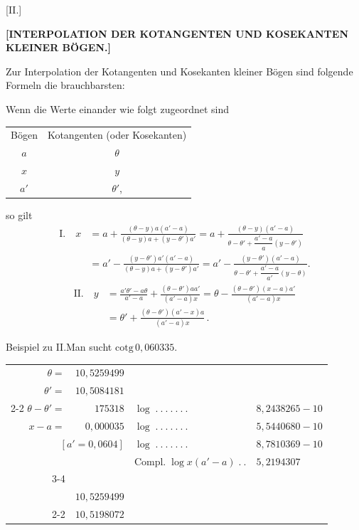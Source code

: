 \clearpage{}
\begin{center}
[II.]

\medskip
\textbf{[INTERPOLATION DER KOTANGENTEN UND KOSEKANTEN KLEINER BÖGEN.]}
\end{center}

Zur Interpolation der Kotangenten und Kosekanten kleiner Bögen sind
folgende Formeln die brauchbarsten:

Wenn die Werte einander wie folgt zugeordnet sind
\begin{center}
\begin{tabular}{cc}
Bögen & Kotangenten (oder Kosekanten) \\
$a$ & $\theta$ \\
$x$ & $y$ \\
$a'$ & $\theta'$, \\
\end{tabular}
\end{center}
so gilt
\[
\begin{aligned}
\mathrm{I.}\quad x &= a+\frac{(\theta-y)a(a'-a)}{(\theta-y)a+(y-\theta')a'}
=a+\frac{(\theta-y)(a'-a)}{\theta-\theta'+\dfrac{a'-a}{a}(y-\theta')}\\[5pt]
&=a'-\frac{(y-\theta')a'(a'-a)}{(\theta-y)a+(y-\theta')a'}
=a'-\frac{(y-\theta')(a'-a)}{\theta-\theta'+\dfrac{a'-a}{a'}(y-\theta)}.
\end{aligned}
\]
\[
\begin{aligned}
\mathrm{II.}\quad y&=\frac{a'\theta'-a\theta}{a'-a}+\frac{(\theta-\theta')aa'}{(a'-a)x}
=\theta-\frac{(\theta-\theta')(x-a)a'}{(a'-a)x}\\[5pt]
&=\theta'+\frac{(\theta-\theta')(a'-x)a}{(a'-a)x}\,.
\end{aligned}
\]

Beispiel zu II.\quad Man sucht $\mathrm{cotg}\,0{,}060335$.
\begin{center}\small
\begin{tabular}{r@{\;}r@{\quad}l@{\;}l}
$\theta=$ & $10{,}5259499$ &&\\
$\theta'=$ & $10{,}5084181$ &&\\\cline{2-2}
$\theta-\theta'=$ & $175318$ & $\log\; .\ .\ .\ .\ .\ .\ .$ & $8{,}2438265-10$\\
$x-a=$ & $0{,}000035$ & $\log\; .\ .\ .\ .\ .\ .\ .$ & $5{,}5440680-10$\\
\multicolumn{2}{r}{$[a'=0{,}0604]$} & $\log\; .\ .\ .\ .\ .\ .\ .$ & $8{,}7810369-10$\\
&& $\mathrm{Compl.}\;\log x(a'-a)\; .\ .$ & $5{,}2194307$\\\cline{3-4}
\multicolumn{4}{r}{$0{,}00614274\; .\ .\ .\ .\ .\ .\ .\ .\ .\ .\ .\ .\ .\ .\ .\ .\ .\ .\ .\ .\;7{,}7883621-10$}\\
&$10{,}5259499$&&\\\cline{2-2}
&$10{,}5198072$&&
\end{tabular}
\end{center}
